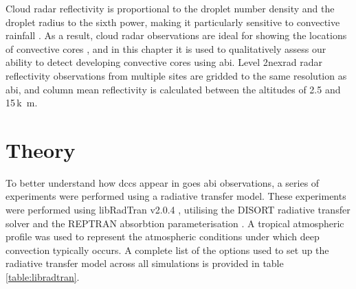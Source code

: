 Cloud radar reflectivity is proportional to the droplet number density and the droplet radius to the sixth power, making it particularly sensitive to convective rainfall \citep{yau_short_1989}.
As a result, cloud radar observations are ideal for showing the locations of convective cores \citep{austin_relation_1987, rosenfeld_general_1993, zipser_vertical_1994}, and in this chapter it is used to qualitatively assess our ability to detect developing convective cores using \acrshort{abi}.
Level 2\acrshort{nexrad} radar reflectivity observations from multiple sites are gridded to the same resolution as \acrshort{abi}, and column mean reflectivity is calculated between the altitudes of 2.5 and 15\,\unit{k m}.

\section{Theory}

To better understand how \acrshort{dcc}s appear in \acrshort{goes} \acrshort{abi} observations, a series of experiments were performed using a radiative transfer model.
These experiments were performed using libRadTran v2.0.4 \citep{emde_libradtran_2016}, utilising the DISORT radiative transfer solver \citep{buras_new_2011} and the REPTRAN absorbtion parameterisation \citep{gasteiger_representative_2014}.
A tropical atmospheric profile was used to represent the atmospheric conditions under which deep convection typically occurs.
A complete list of the options used to set up the radiative transfer model across all simulations is provided in table \ref{table:libradtran}.

